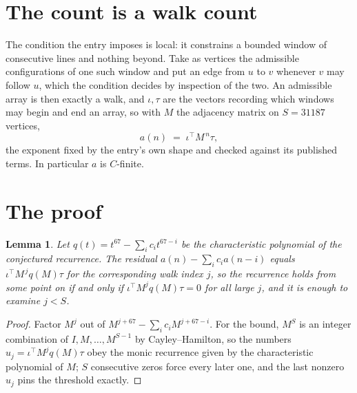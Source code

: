 \documentclass[11pt,a4paper]{article}
\theoremstyle{plain}
\newtheorem{lemma}[theorem]{Lemma}
\theoremstyle{definition}
\begin{document}
\section{The count is a walk count}

The condition the entry imposes is local: it constrains a bounded window of consecutive lines and nothing beyond. Take as vertices the admissible configurations of one such window and put an edge from $u$ to $v$ whenever $v$ may follow $u$, which the condition decides by inspection of the two.
An admissible array is then exactly a walk, and $\iota,\tau$ are the vectors recording which windows may begin and end an array, so with $M$ the adjacency matrix on $S=31187$ vertices,
\[
a(n)\;=\;\iota^{\!\top}M^{\,n}\tau ,
\]
the exponent fixed by the entry's own shape and checked against its published terms. In
particular $a$ is $C$-finite.

\section{The proof}

\begin{lemma}\label{lem:crit}
Let $q(t)=t^{67}-\sum_i c_it^{67-i}$ be the characteristic polynomial of the
conjectured recurrence. The residual $a(n)-\sum_ic_ia(n-i)$ equals
$\iota^{\!\top}M^{\,j}q(M)\tau$ for the corresponding walk index $j$, so the recurrence
holds from some point on if and only if $\iota^{\!\top}M^{j}q(M)\tau=0$ for all large $j$,
and it is enough to examine $j<S$.
\end{lemma}

\begin{proof}
Factor $M^{j}$ out of $M^{j+67}-\sum_ic_iM^{j+67-i}$. For the bound, $M^{S}$
is an integer combination of $I,M,\dots,M^{S-1}$ by Cayley--Hamilton, so the numbers
$u_j=\iota^{\!\top}M^{j}q(M)\tau$ obey the monic recurrence given by the characteristic
polynomial of $M$; $S$ consecutive zeros force every later one, and the last nonzero $u_j$
pins the threshold exactly.
\end{proof}
\end{document}

